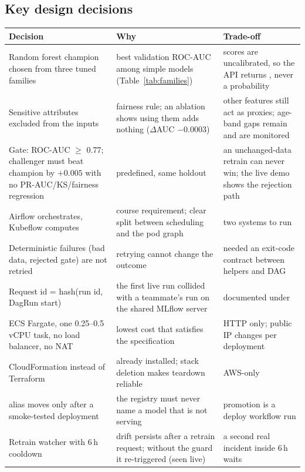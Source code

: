 \documentclass[11pt,a4paper]{article}
\newcommand{\code}[1]{\texttt{\detokenize{#1}}}
\newcommand{\hdr}[1]{\textbf{\color{navy}#1}}
\begin{document}
\subsection{Key design decisions}
\begin{longtable}{L{3.9cm}L{5.2cm}L{4.7cm}}
\toprule
\hdr{Decision} & \hdr{Why} & \hdr{Trade-off}\\
\midrule\endhead
Random forest champion chosen from three tuned families & best validation ROC-AUC among simple models (Table~\ref{tab:families}) & scores are uncalibrated, so the API returns \code{risk_score}, never a probability\\
Sensitive attributes excluded from the inputs & fairness rule; an ablation shows using them adds nothing ($\Delta$AUC $-0.0003$) & other features still act as proxies; age-band gaps remain and are monitored\\
Gate: ROC-AUC $\geq$ 0.77; challenger must beat champion by $+0.005$ with no PR-AUC/KS/fairness regression & predefined, same holdout & an unchanged-data retrain can never win; the live demo shows the rejection path\\
Airflow orchestrates, Kubeflow computes & course requirement; clear split between scheduling and the pod graph & two systems to run\\
Deterministic failures (bad data, rejected gate) are not retried & retrying cannot change the outcome & needed an exit-code contract between helpers and DAG\\
Request id = hash(run id, DagRun start) & the first live run collided with a teammate's run on the shared MLflow server & documented under \code{evidence/phase-5}\\
ECS Fargate, one 0.25--0.5\,vCPU task, no load balancer, no NAT & lowest cost that satisfies the specification & HTTP only; public IP changes per deployment\\
CloudFormation instead of Terraform & already installed; stack deletion makes teardown reliable & AWS-only\\
\code{champion} alias moves only after a smoke-tested deployment & the registry must never name a model that is not serving & promotion is a deploy workflow run\\
Retrain watcher with 6\,h cooldown & drift persists after a retrain request; without the guard it re-triggered (seen live) & a second real incident inside 6\,h waits\\
\bottomrule
\end{longtable}
\end{document}
